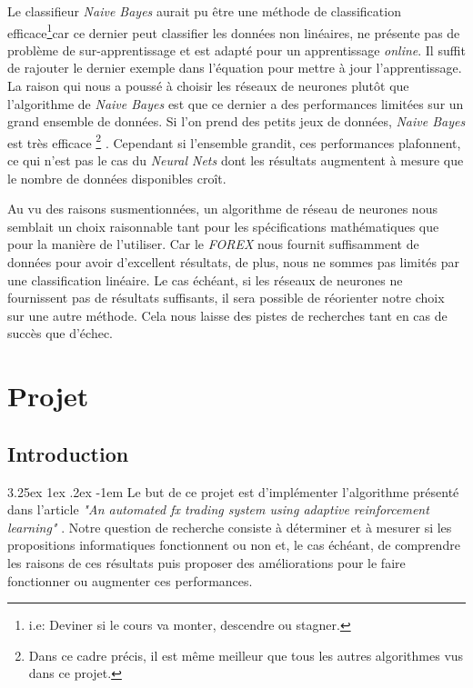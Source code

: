 \documentclass[a4paper, 11pt]{article}
\makeatletter
\renewcommand\paragraph{\@startsection{paragraph}{5}{\z@}%
  {3.25ex \@plus1ex \@minus.2ex}%
  {-1em}%
  {\normalfont\normalsize\bfseries}}
\makeatother
\begin{document}
Le classifieur \textit{Naive Bayes} aurait pu être une méthode de classification efficace\footnote{i.e: Deviner si le cours va monter, descendre ou stagner.}car ce dernier peut classifier les données non linéaires,
ne présente pas de problème de sur-apprentissage et est adapté pour un apprentissage \textit{online}. Il suffit de rajouter le
dernier exemple dans l'équation pour mettre à jour l'apprentissage. La raison qui nous a poussé à choisir les réseaux de neurones 
plutôt que l'algorithme de \textit{Naive Bayes} est que ce dernier a des performances limitées sur un grand ensemble de données.
Si l'on prend des petits jeux de données, \textit{Naive Bayes} est très efficace
\footnote{Dans ce cadre précis, il est même meilleur que tous les autres algorithmes vus dans ce projet.}
\cite{ml_petites_donnees}.
Cependant si l'ensemble grandit, ces performances plafonnent, ce qui n'est pas le cas du \textit{Neural Nets} dont les
résultats augmentent à mesure que le nombre de données disponibles croît.

Au vu des raisons susmentionnées, un algorithme de réseau de neurones nous semblait un choix raisonnable tant pour les spécifications mathématiques que pour la manière de l'utiliser. Car le \textit{FOREX} nous
fournit suffisamment de données pour avoir d'excellent résultats, de plus, nous ne sommes pas limités par une classification linéaire.
Le cas échéant, si les réseaux de neurones ne fournissent pas de résultats suffisants, il sera possible de réorienter notre choix sur une autre méthode. Cela nous laisse des pistes de recherches tant en cas de succès que d'échec.


\newpage
\section{Projet}
\subsection{Introduction}
\paragraph{}
Le but de ce projet est d'implémenter l'algorithme présenté dans l'article \textit{"An automated fx trading system using adaptive
reinforcement learning"} \cite{fx_trading}. Notre question de recherche consiste à déterminer et à mesurer si les propositions informatiques
fonctionnent ou non et, le cas
échéant, de comprendre les raisons de ces résultats puis proposer des améliorations pour le faire fonctionner ou augmenter ces performances.
\end{document}
